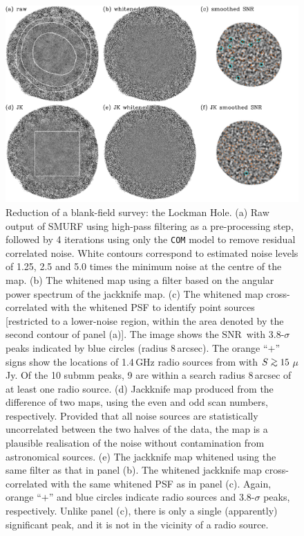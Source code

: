\documentclass[useAMS,usenatbib,nofootinbib]{mn2e}
\newcommand{\snr}{SNR}
\def\gsim{\mathrel{\lower2.5pt\vbox{\lineskip=0pt\baselineskip=0pt
          \hbox{$>$}\hbox{$\sim$}}}}
\newcommand{\model}[1]{\texttt{#1}}
\begin{document}
\begin{figure}
\centering
\includegraphics[width=\linewidth]{lockman_maps}
\caption{Reduction of a blank-field survey: the Lockman Hole. (a) Raw
  output of SMURF using high-pass filtering as a pre-processing step,
  followed by 4 iterations using only the \model{COM} model to remove
  residual correlated noise. White contours correspond to estimated
  noise levels of 1.25, 2.5 and 5.0 times the minimum noise at the
  centre of the map. (b) The whitened map using a filter based on the
  angular power spectrum of the jackknife map. (c) The whitened map
  cross-correlated with the whitened PSF to identify point sources
  [restricted to a lower-noise region, within the area denoted by the
  second contour of panel (a)]. The image shows the \snr\, with
  3.8-$\sigma$ peaks indicated by blue circles (radius 8\,arcsec). The
  orange ``$+$'' signs show the locations of 1.4\,GHz radio sources
  from \citet{owen2008} with $S\gsim15$\,$\mu$Jy. Of the 10 submm
  peaks, 9 are within a search radius 8\,arcsec of at least one radio
  source. (d) Jackknife map produced from the difference of two maps,
  using the even and odd scan numbers, respectively. Provided that all
  noise sources are statistically uncorrelated between the two halves
  of the data, the map is a plausible realisation of the noise without
  contamination from astronomical sources. (e) The jackknife map
  whitened using the same filter as that in panel (b). The whitened
  jackknife map cross-correlated with the same whitened PSF as in
  panel (c). Again, orange ``$+$'' and blue circles indicate radio
  sources and 3.8-$\sigma$ peaks, respectively. Unlike panel (c),
  there is only a single (apparently) significant peak, and it is not
  in the vicinity of a radio source.}
\label{fig:lockman_maps}
\end{figure}
\end{document}
